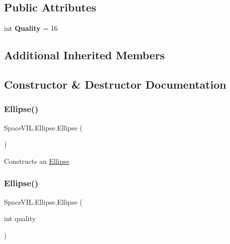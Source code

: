 \subsection*{Public Attributes}
\begin{DoxyCompactItemize}
\item 
\mbox{\label{class_space_v_i_l_1_1_ellipse_acd5d2d2d328d5463759a1f8528d7640b}} 
int {\bfseries Quality} = 16
\end{DoxyCompactItemize}
\subsection*{Additional Inherited Members}


\subsection{Constructor \& Destructor Documentation}
\mbox{\label{class_space_v_i_l_1_1_ellipse_a33ed4c5c8bbdb3a3fe9001292dc7b58e}} 
\subsubsection{\texorpdfstring{Ellipse()}{Ellipse()}\hspace{0.1cm}{\footnotesize\ttfamily [1/2]}}
{\footnotesize\ttfamily Space\+V\+I\+L.\+Ellipse.\+Ellipse (\begin{DoxyParamCaption}{ }\end{DoxyParamCaption})\hspace{0.3cm}{\ttfamily [inline]}}



Constructs an \mbox{\hyperlink{class_space_v_i_l_1_1_ellipse}{Ellipse}} 

\mbox{\label{class_space_v_i_l_1_1_ellipse_a972b5c63aba04b84274f5048351a851a}} 
\subsubsection{\texorpdfstring{Ellipse()}{Ellipse()}\hspace{0.1cm}{\footnotesize\ttfamily [2/2]}}
{\footnotesize\ttfamily Space\+V\+I\+L.\+Ellipse.\+Ellipse (\begin{DoxyParamCaption}\item[{int}]{quality }\end{DoxyParamCaption})\hspace{0.3cm}{\ttfamily [inline]}}



